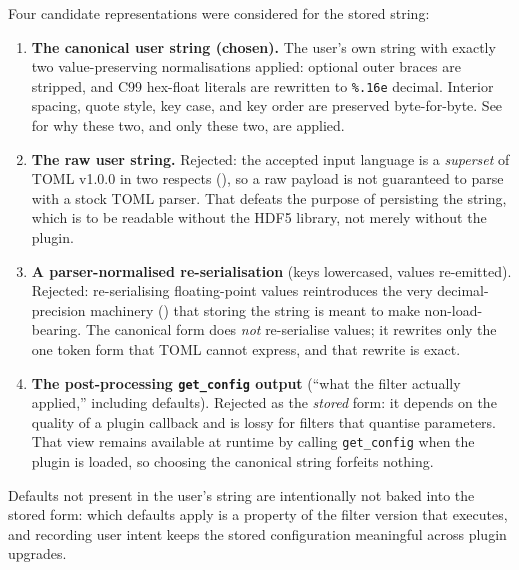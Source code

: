 \documentclass[../RFC-HDFG-2026-001.tex]{subfiles}
\begin{document}

Four candidate representations were considered for the stored string:

\begin{enumerate}
\item \textbf{The canonical user string (chosen).}  The user's own string
  with exactly two value-preserving normalisations applied: optional outer
  braces are stripped, and C99 hex-float literals are rewritten to
  \texttt{\%.16e} decimal.  Interior spacing, quote style, key case, and
  key order are preserved byte-for-byte.  See
   for why these two, and only these
  two, are applied.
\item \textbf{The raw user string.}  Rejected: the accepted input language
  is a \emph{superset} of TOML v1.0.0 in two respects
  (), so a raw payload is not
  guaranteed to parse with a stock TOML parser.  That defeats the purpose
  of persisting the string, which is to be readable without the HDF5
  library, not merely without the plugin.
\item \textbf{A parser-normalised re-serialisation} (keys lowercased,
  values re-emitted).  Rejected: re-serialising floating-point values
  reintroduces the very decimal-precision machinery
  () that storing the string is meant to
  make non-load-bearing.  The canonical form does \emph{not} re-serialise
  values; it rewrites only the one token form that TOML cannot express, and
  that rewrite is exact.
\item \textbf{The post-processing \texttt{get\_config} output} (``what the
  filter actually applied,'' including defaults).  Rejected as the
  \emph{stored} form: it depends on the quality of a plugin callback and is
  lossy for filters that quantise parameters.  That view remains available
  at runtime by calling \texttt{get\_config} when the plugin is loaded, so
  choosing the canonical string forfeits nothing.
\end{enumerate}

Defaults not present in the user's string are intentionally not baked into
the stored form: which defaults apply is a property of the filter version
that executes, and recording user intent keeps the stored configuration
meaningful across plugin upgrades.

\label{sec:config-canonical-form}
\end{document}
